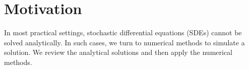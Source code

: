 \section*{Motivation}
In most practical settings, stochastic differential equations (SDEs) cannot be solved analytically. In such cases, we turn to numerical methods to simulate a solution. We review the analytical solutions and then apply the numerical methods.
